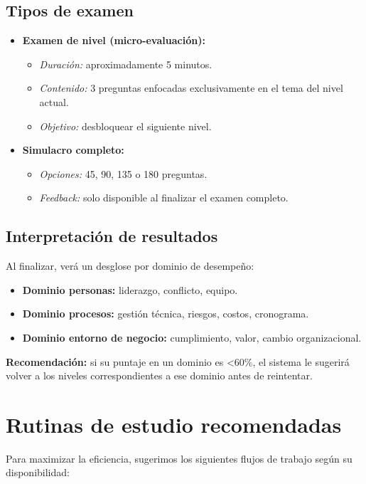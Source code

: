 \subsection{Tipos de examen}
\begin{itemize}
\item \textbf{Examen de nivel (micro-evaluación):}
\begin{itemize}
\item \textit{Duración:} aproximadamente 5 minutos.
\item \textit{Contenido:} 3 preguntas enfocadas exclusivamente en el tema del nivel actual.
\item \textit{Objetivo:} desbloquear el siguiente nivel.
\end{itemize}
\end{itemize}
\begin{itemize}
\item \textbf{Simulacro completo:}
\begin{itemize}
\item \textit{Opciones:} 45, 90, 135 o 180 preguntas.
\item \textit{Feedback:} solo disponible al finalizar el examen completo.
\end{itemize}
\end{itemize}
\subsection{Interpretación de resultados}
Al finalizar, verá un desglose por dominio de desempeño:
\begin{itemize}
\item \textbf{Dominio personas:} liderazgo, conflicto, equipo.
\item \textbf{Dominio procesos:} gestión técnica, riesgos, costos, cronograma.
\item \textbf{Dominio entorno de negocio:} cumplimiento, valor, cambio organizacional.
\end{itemize}
\textbf{Recomendación:} si su puntaje en un dominio es <60\%, el sistema le sugerirá volver a los niveles correspondientes a ese dominio antes de reintentar.

\section{Rutinas de estudio recomendadas}

Para maximizar la eficiencia, sugerimos los siguientes flujos de trabajo según su disponibilidad:

